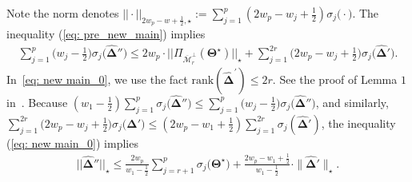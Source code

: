 \documentclass[alpha-refs]{wiley-article}
\begin{document}
Note the norm denotes $ ||\cdot||_{2w_{p} - w + \frac{1}{2}, \star} := \sum^{p}_{j = 1} (2w_{p}-w_{j}+\frac{1}{2}) \sigma_{j}\big(\cdot\big)$.
The inequality (\ref{eq: pre_new_main}) implies
\begin{eqnarray} \label{eq: new main_0}
    \sum^{p}_{j = 1}\bigg(w_{j} - \frac{1}{2}\bigg)\sigma_{j}\big(\boldsymbol{\widehat{\Delta}}''\big) \leq  2w_{p} \cdot ||\Pi_{\overline{\mathcal{M}}_{r}^{\perp}}(\boldsymbol{\Theta^{\star}})||_{\star} + \sum^{2r}_{j = 1} \bigg(2w_{p}-w_{j} + \frac{1}{2} \bigg) \sigma_{j}\big(\boldsymbol{\widehat{\Delta}}'\big).
\end{eqnarray}
In~\eqref{eq: new main_0}, we use the fact $\text{rank}(\boldsymbol{\widehat{\Delta}}^{'}) \leq 2r$.
See the proof of Lemma $1$ in~\cite{negahban2011estimation}.
Because  $(w_{1} - \frac{1}{2})\sum^{p}_{j = 1}\sigma_{j}\big(\boldsymbol{\widehat{\Delta}}''\big) \leq \sum^{p}_{j = 1}\big(w_{j} - \frac{1}{2}\big)\sigma_{j}\big(\boldsymbol{\widehat{\Delta}}''\big)$, and similarly, $\sum^{2r}_{j = 1}\big(2w_{p} - w_{j} +  \frac{1}{2}\big)\sigma_{j}\big(\boldsymbol{\widehat{\Delta}}'\big)\leq (2w_{p}-w_{1}+\frac{1}{2})\sum_{j=1}^{2r}\sigma_{j}(\boldsymbol{\widehat{\Delta}}')$,
the inequality (\ref{eq: new main_0}) implies
\begin{align}
    ||\boldsymbol{\widehat{\Delta}}''||_{\star} \leq \frac{2w_{p}}{w_{1}-\frac{1}{2}} \sum_{j=r+1}^{p}\sigma_{j}\big(\boldsymbol{\Theta^{\star}}\big)
    + \frac{2w_{p}-w_{1}+\frac{1}{2}}{w_{1}-\frac{1}{2}}\cdot \| \boldsymbol{\widehat{\Delta}}' \|_{\star}.
    \label{eq: new main_1}
\end{align}

\end{document}
